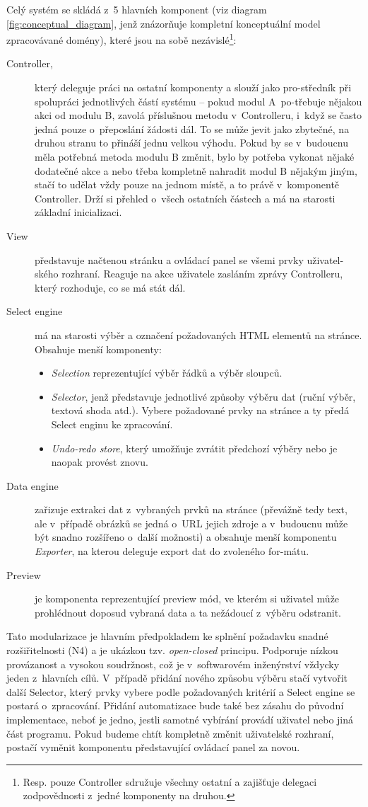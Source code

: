 \documentclass[thesis=B,czech]{FITthesis}[2012/06/26]
\begin{document}
Celý systém se skládá z~5 hlavních komponent (viz diagram \ref{fig:conceptual_diagram}, jenž znázorňuje kompletní konceptuální model zpracovávané domény), které jsou na sobě nezávislé\footnote{Resp. pouze Controller sdružuje všechny ostatní a zajišťuje delegaci zodpovědnosti z~jedné komponenty na druhou.}:
\begin{description}
	\item [Controller,] který deleguje práci na ostatní komponenty a slouží jako pro-středník při spolupráci jednotlivých částí systému -- pokud modul A~po-třebuje nějakou akci od modulu B, zavolá příslušnou metodu v~Controlleru, i~když se často jedná pouze o~přeposlání žádosti dál. To se může jevit jako zbytečné, na druhou stranu to přináší jednu velkou výhodu. Pokud by se v~budoucnu měla potřebná metoda modulu B změnit, bylo by potřeba vykonat nějaké dodatečné akce a nebo třeba kompletně nahradit modul B nějakým jiným, stačí to udělat vždy pouze na jednom místě, a to právě v~komponentě Controller. Drží si přehled o~všech ostatních částech a má na starosti základní inicializaci.
	\item [View] představuje načtenou stránku a ovládací panel se všemi prvky uživatel-ského rozhraní. Reaguje na akce uživatele zasláním zprávy Controlleru, který rozhoduje, co se má stát dál.
	\item [Select engine] má na starosti výběr a označení požadovaných HTML elementů na stránce. Obsahuje menší komponenty:
	\begin{itemize}
		\item \emph{Selection} reprezentující výběr řádků a výběr sloupců.
		\item \emph{Selector}, jenž představuje jednotlivé způsoby výběru dat (ruční výběr, textová shoda atd.). Vybere požadované prvky na stránce a ty předá Select enginu ke zpracování.
		\item \emph{Undo-redo store}, který umožňuje zvrátit předchozí výběry nebo je naopak provést znovu.
	\end{itemize}
	\item [Data engine] zařizuje extrakci dat z~vybraných prvků na stránce (převážně tedy text, ale v~případě obrázků se jedná o~URL jejich zdroje a v~budoucnu může být snadno rozšířeno o~další možnosti) a obsahuje menší komponentu \emph{Exporter}, na kterou deleguje export dat do zvoleného for-mátu.
	\item [Preview] je komponenta reprezentující preview mód, ve kterém si uživatel může prohlédnout doposud vybraná data a ta nežádoucí z~výběru odstranit.
\end{description}
Tato modularizace je hlavním předpokladem ke splnění požadavku snadné rozšiřitelnosti (N4) a je ukázkou tzv. \emph{open-closed} principu. Podporuje nízkou provázanost a vysokou soudržnost, což je v~softwarovém inženýrství vždycky jeden z~hlavních cílů. V~případě přidání nového způsobu výběru stačí vytvořit další Selector, který prvky vybere podle požadovaných kritérií a Select engine se postará o~zpracování. Přidání automatizace bude také bez zásahu do původní implementace, neboť je jedno, jestli samotné vybírání provádí uživatel nebo jiná část programu. Pokud budeme chtít kompletně změnit uživatelské rozhraní, postačí vyměnit komponentu představující ovládací panel za novou.
\end{document}
